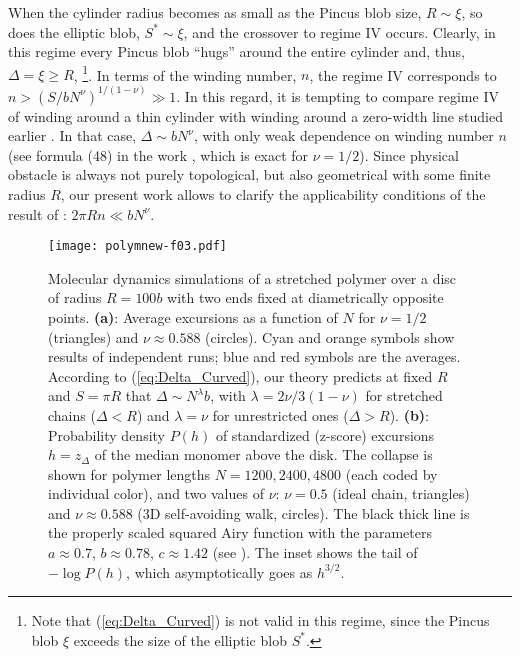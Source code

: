 \documentclass[aps,pre,floatfix,twocolumn,nofootinbib]{revtex4-2}
\newcommand{\eq}[1]{(\ref{#1})}
\begin{document}
When the cylinder radius becomes as small as the Pincus blob size, $R \sim \xi$, so does the elliptic blob, $S^{\ast} \sim \xi$, and the crossover to regime IV occurs. Clearly, in this regime every Pincus blob ``hugs'' around the entire cylinder and, thus, $\Delta = \xi \ge R$, \footnote{Note that \eq{eq:Delta_Curved} is not valid in this regime, since the Pincus blob $\xi$ exceeds the size of the elliptic blob $S^{\ast}$.}. In terms of the winding number, $n$, the regime IV corresponds to $n > \left(S/bN^\nu\right)^{1/(1-\nu)} \gg 1$. In this regard, it is tempting to compare regime IV of winding around a thin cylinder with winding around a zero-width line studied earlier \cite{Edwards:1967, Prager_Frisch, Chen, Comtet, Grosberg_Frish:2003}. In that case, $\Delta \sim b N^{\nu}$, with only weak dependence on winding number $n$ (see formula (48) in the work \cite{Grosberg_Frish:2003}, which is exact for $\nu = 1/2$). Since physical obstacle is always not purely topological, but also geometrical with some finite radius $R$, our present work allows to clarify the applicability conditions of the result of \cite{Grosberg_Frish:2003}: $2 \pi R n \ll b N^{\nu}$.


\begin{figure}
  \centering
  \texttt{[image: polymnew-f03.pdf]}
  \caption{Molecular dynamics simulations of a stretched polymer over a disc of radius $R = 100b$ with two ends fixed at diametrically opposite points. \textbf{(a)}: Average excursions as a function of $N$ for $\nu=1/2$ (triangles) and $\nu\approx 0.588$ (circles). Cyan and orange symbols show results of independent runs; blue and red symbols are the averages. According to \eq{eq:Delta_Curved}, our theory predicts at fixed $R$ and $S = \pi R$ that $\Delta \sim N^{\lambda} b$, with $\lambda = 2 \nu/3(1-\nu)$ for stretched chains ($\Delta < R$) and $\lambda = \nu$ for unrestricted ones ($\Delta > R$). \textbf{(b)}: Probability density $P(h)$ of standardized (z-score) excursions $h=z_\Delta$ of the median monomer above the disk. The collapse is shown for polymer lengths $N=1200,2400,4800$ (each coded by individual color), and two values of $\nu$: $\nu=0.5$ (ideal chain, triangles) and $\nu\approx 0.588$ (3D self-avoiding walk, circles). The black thick line is the properly scaled squared Airy function with the parameters $a \approx 0.7$, $b \approx 0.78$, $c \approx 1.42$ (see \cite[Section S4]{SupMat}). The inset shows the tail of $-\log P(h)$, which asymptotically goes as $h^{3/2}$.}
  \label{fig:pol-f03}
\end{figure}
\end{document}
